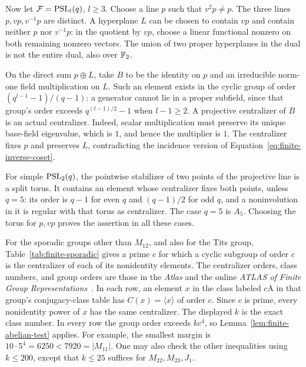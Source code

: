 Now let $\mathcal F=\operatorname{PSL}_l(q)$, $l\ge3$. Choose a line $p$ such that
$v^2p\ne p$. The three lines $p,vp,v^{-1}p$ are distinct. A hyperplane
$L$ can be chosen to contain $vp$ and contain neither $p$ nor $v^{-1}p$:
in the quotient by $vp$, choose a linear functional nonzero on both
remaining nonzero vectors. The union of two proper hyperplanes in the
dual is not the entire dual, also over $\mathbb F_2$.

On the direct sum $p\oplus L$, take $B$ to be the identity on $p$ and
an irreducible norm-one field multiplication on $L$. Such an element
exists in the cyclic group of order $(q^{l-1}-1)/(q-1)$: a generator
cannot lie in a proper subfield, since that group's order exceeds
$q^{(l-1)/2}-1$ when $l-1\ge2$. A projective centralizer of $B$ is an
actual centralizer. Indeed, scalar multiplication must preserve its
unique base-field eigenvalue, which is $1$, and hence the multiplier is
$1$. The centralizer fixes $p$ and preserves $L$, contradicting the
incidence version of Equation~\eqref{eq:finite-inverse-coset}.

For simple $\operatorname{PSL}_2(q)$, the pointwise stabilizer of two points of the
projective line is a split torus. It contains an element whose
centralizer fixes both points, unless $q=5$: its order is $q-1$ for
even $q$ and $(q-1)/2$ for odd $q$, and a noninvolution in it is regular
with that torus as centralizer. The case $q=5$ is $A_5$. Choosing the
torus for $p,vp$ proves the assertion in all these cases.

For the sporadic groups other than $M_{12}$, and also for the Tits group,
Table~\ref{tab:finite-sporadic} gives a prime $c$ for which a cyclic
subgroup of order $c$ is the centralizer of each of its nonidentity
elements. The centralizer orders, class numbers, and group orders are
those in the \emph{Atlas} and the online \emph{ATLAS of Finite Group
Representations}~\cite{Atlas,AtlasOnline}. In each row, an element $x$
in the class labeled $c\mathrm A$ in that group's conjugacy-class table
has $C(x)=\langle x\rangle$ of order $c$. Since $c$ is prime, every
nonidentity power of $x$ has the same centralizer.
The displayed $k$ is the exact class number. In every row the group
order exceeds $kc^4$, so Lemma~\ref{lem:finite-abelian-test} applies.
For example, the smallest margin is $10\cdot5^4=6250<7920=|M_{11}|$.
One may also check the other inequalities using $k\le200$, except that
$k\le25$ suffices for $M_{22},M_{23},J_1$.

